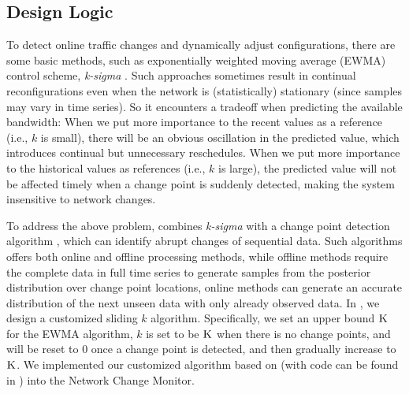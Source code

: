 {\subsection{Design Logic}
\label{subsec:dynamic:prediction}
To detect online traffic changes and dynamically adjust configurations, there are some basic methods, such as exponentially weighted moving average (EWMA) control scheme, \textit{k-sigma} \cite{roberts1959control,lucas1990exponentially}. Such approaches sometimes result in continual reconfigurations even when the network is (statistically) stationary (since samples may vary in time series). So it encounters a  tradeoff when predicting the available bandwidth: When we put more importance to the recent values as a reference (i.e., $k$ is small), there will be an obvious oscillation in the predicted value, which introduces  continual but unnecessary reschedules. When we put more importance to the historical values as references (i.e., $k$ is large), the predicted value will not be affected timely when a change point is suddenly detected, making the system insensitive to network changes.

To address the above problem, \name combines \textit{k-sigma}  with  a change point detection algorithm \cite{adams2007bayesian}, which can identify abrupt changes of sequential data. Such algorithms offers both online and offline processing methods, while offline methods \cite{smith1975bayesian,stephens1994bayesian,barry1993bayesian,green1995reversible} require the complete data in full time series to generate samples from the posterior distribution over change point locations, online methods \cite{page1955test,desobry2005online,lorden1971procedures} can generate an accurate distribution of the next unseen data with only already observed data.  In \name, we design a customized sliding $k$ algorithm. Specifically, we set an upper bound $\textsc{K}$ for the EWMA algorithm, $k$ is set to be $\textsc{K}$ when there is no change points, and will be reset to $0$ once a change point is detected, and then gradually increase to $\textsc{K}$. We implemented our customized algorithm based on \cite{adams2007bayesian} (with code can be found in \cite{BOCDcode}) into the Network Change Monitor.

}
